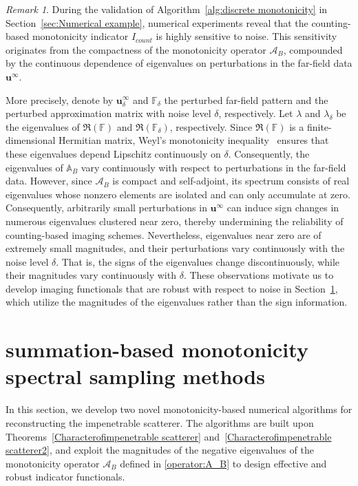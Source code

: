 \documentclass[11pt,reqno,twoside]{amsart}
\theoremstyle{definition}
\theoremstyle{remark}
\newtheorem{rem}{Remark}[section]
\numberwithin{equation}{section}
\begin{document}
\begin{rem}\label{rem:al1}
During the validation of Algorithm~\ref{alg:discrete monotonicity} in Section~\ref{sec:Numerical example}, numerical experiments reveal that the counting-based monotonicity indicator $I_{count}$ is highly sensitive to noise. This sensitivity originates from the compactness of the monotonicity operator $\mathcal{A}_B$, compounded by the continuous dependence of eigenvalues on perturbations in the far-field data $\mathbf{u}^{\infty}$.

More precisely, denote by $\mathbf{u}^\infty_\delta$ and $\mathbb{F}_{\delta}$ the perturbed far-field pattern and the perturbed approximation matrix with noise level $\delta$, respectively. Let $\lambda$ and $\lambda_\delta$ be the eigenvalues of $\Re (\mathbb{F})$ and $\Re (\mathbb{F}_{\delta})$, respectively. Since $\Re (\mathbb{F})$ is a finite-dimensional Hermitian matrix, Weyl's monotonicity inequality~\cite{Kato13,SS90} ensures that these eigenvalues depend Lipschitz continuously on $\delta$. Consequently, the eigenvalues of $\mathbb{A}_{B}$ vary continuously with respect to perturbations in the far-field data.
However, since $\mathcal{A}_{B}$ is compact and self-adjoint,  its spectrum consists of real eigenvalues whose nonzero elements are isolated and can only accumulate at zero. Consequently, arbitrarily small perturbations in \(\mathbf{u}^{\infty}\) can induce sign changes in numerous eigenvalues clustered near zero, thereby undermining the reliability of counting-based imaging schemes. Nevertheless, eigenvalues near zero are of extremely small magnitudes, and their perturbations vary continuously with the noise level $\delta$. That is, the signs of the eigenvalues change discontinuously, while their magnitudes vary continuously with $\delta$. These observations motivate us to develop imaging functionals that are robust with respect to noise in Section~\ref{sec:Numerical algorithm}, which utilize the magnitudes of the eigenvalues rather than the sign information.

\end{rem}


\section{ summation-based monotonicity spectral sampling methods}\label{sec:Numerical algorithm}

In this section, we develop two novel monotonicity-based numerical algorithms for reconstructing the impenetrable scatterer. The algorithms are built upon
Theorems~\ref{Characterofimpenetrable scatterer} and~\ref{Characterofimpenetrable scatterer2}, and exploit the magnitudes of the negative eigenvalues of the monotonicity operator $\mathcal{A}_{B}$ defined in \eqref{operator:A_B} to design effective and robust indicator functionals.
\end{document}
